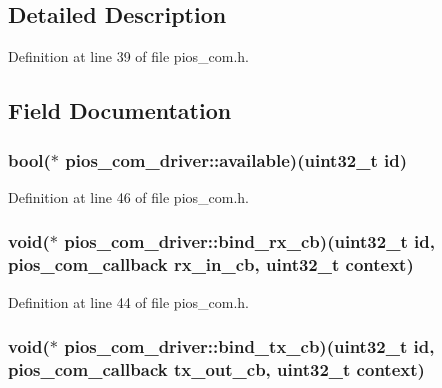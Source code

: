 \subsection{\-Detailed \-Description}


\-Definition at line 39 of file pios\-\_\-com.\-h.



\subsection{\-Field \-Documentation}
\hypertarget{structpios__com__driver_ad9a0f07f6ebff7536ed37a97d4c41608}{
\subsubsection[{available}]{\setlength{\rightskip}{0pt plus 5cm}bool($\ast$ {\bf pios\-\_\-com\-\_\-driver\-::available})(uint32\-\_\-t {\bf id})}}\label{structpios__com__driver_ad9a0f07f6ebff7536ed37a97d4c41608}


\-Definition at line 46 of file pios\-\_\-com.\-h.

\hypertarget{structpios__com__driver_aed9041fdd757cf95e57c9d523e30fd57}{
\subsubsection[{bind\-\_\-rx\-\_\-cb}]{\setlength{\rightskip}{0pt plus 5cm}void($\ast$ {\bf pios\-\_\-com\-\_\-driver\-::bind\-\_\-rx\-\_\-cb})(uint32\-\_\-t {\bf id}, {\bf pios\-\_\-com\-\_\-callback} rx\-\_\-in\-\_\-cb, uint32\-\_\-t context)}}\label{structpios__com__driver_aed9041fdd757cf95e57c9d523e30fd57}


\-Definition at line 44 of file pios\-\_\-com.\-h.

\hypertarget{structpios__com__driver_a94f7de4245688ab695cca1564be28cd6}{
\subsubsection[{bind\-\_\-tx\-\_\-cb}]{\setlength{\rightskip}{0pt plus 5cm}void($\ast$ {\bf pios\-\_\-com\-\_\-driver\-::bind\-\_\-tx\-\_\-cb})(uint32\-\_\-t {\bf id}, {\bf pios\-\_\-com\-\_\-callback} tx\-\_\-out\-\_\-cb, uint32\-\_\-t context)}}\label{structpios__com__driver_a94f7de4245688ab695cca1564be28cd6}


